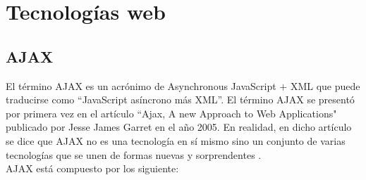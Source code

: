 %

\section{Tecnologías web}


\subsection{AJAX}

El término AJAX es un acrónimo de Asynchronous JavaScript $+$ XML que puede traducirse como ``JavaScript asíncrono más XML''. El término AJAX se presentó por primera vez en el artículo ``Ajax, A new Approach to Web Applications" publicado por Jesse James Garret en el año 2005. En realidad, en dicho artículo se dice que AJAX no es una tecnología en sí mismo sino un conjunto de varias tecnologías que se unen de formas nuevas y sorprendentes \cite{ajax_dummies_2006}.\\

AJAX está compuesto por los siguiente:


